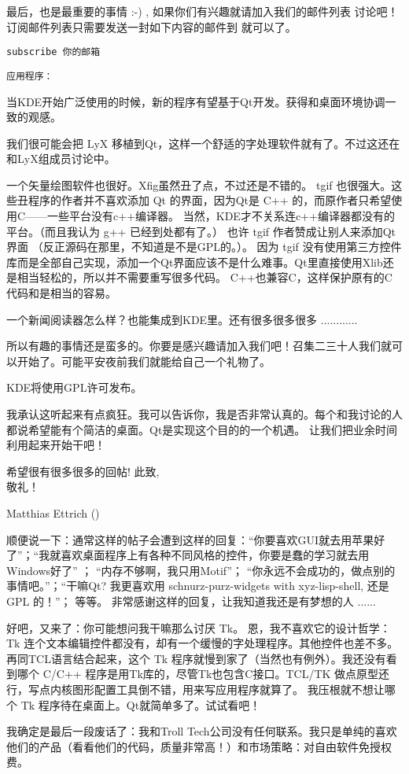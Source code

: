\begin{insertnote}
{	最后，也是最重要的事情 :-) , 如果你们有兴趣就请加入我们的邮件列表   讨论吧！
	订阅邮件列表只需要发送一封如下内容的邮件到  就可以了。
	
\begin{center}
	{\tt subscribe 你的邮箱}
\end{center}


{ \noindent \tt 应用程序：}

	当KDE开始广泛使用的时候，新的程序有望基于Qt开发。获得和桌面环境协调一致的观感。

    我们很可能会把 LyX 移植到Qt，这样一个舒适的字处理软件就有了。不过这还在和LyX组成员讨论中。

    一个矢量绘图软件也很好。Xfig虽然丑了点，不过还是不错的。 tgif 也很强大。这些丑程序的作者并不喜欢添加 Qt 的界面，因为Qt是 C++ 的，而原作者只希望使用C——一些平台没有c++编译器。
    当然，KDE才不关系连c++编译器都没有的平台。（而且我认为 g++ 已经到处都有了。） 也许 tgif 作者赞成让别人来添加Qt界面 （反正源码在那里，不知道是不是GPL的。）。
    因为 tgif 没有使用第三方控件库而是全部自己实现，添加一个Qt界面应该不是什么难事。Qt里直接使用Xlib还是相当轻松的，所以并不需要重写很多代码。
    C++也兼容C，这样保护原有的C代码和是相当的容易。

    一个新闻阅读器怎么样？也能集成到KDE里。还有很多很多很多 ............

}

所以有趣的事情还是蛮多的。你要是感兴趣请加入我们吧！召集二三十人我们就可以开始了。可能平安夜前我们就能给自己一个礼物了。

KDE将使用GPL许可发布。

我承认这听起来有点疯狂。我可以告诉你，我是否非常认真的。每个和我讨论的人都说希望能有个简洁的桌面。Qt是实现这个目的的一个机遇。
让我们把业余时间利用起来开始干吧！

希望很有很多很多的回帖!
此致,\\
\qquad 敬礼！

Matthias Ettrich
()

顺便说一下：通常这样的帖子会遭到这样的回复：“你要喜欢GUI就去用苹果好了”；“我就喜欢桌面程序上有各种不同风格的控件，你要是蠢的学习就去用Windows好了” ； “内存不够啊，我只用Motif”；
“你永远不会成功的，做点别的事情吧。”；“干嘛Qt? 我更喜欢用 schnurz-purz-widgets with xyz-lisp-shell, 还是 GPL 的！”； 等等。
非常感谢这样的回复，让我知道我还是有梦想的人 ......

好吧，又来了：你可能想问我干嘛那么讨厌 Tk。 恩，我不喜欢它的设计哲学： Tk 连个文本编辑控件都没有，却有一个缓慢的字处理程序。其他控件也差不多。
再同TCL语言结合起来，这个 Tk 程序就慢到家了（当然也有例外）。我还没有看到哪个 C/C++ 程序是用Tk库的，尽管Tk也包含C接口。TCL/TK 做点原型还行，写点内核图形配置工具倒不错，用来写应用程序就算了。
我压根就不想让哪个 Tk 程序待在桌面上。Qt就简单多了。试试看吧！

我确定是最后一段废话了：我和Troll Tech公司没有任何联系。我只是单纯的喜欢他们的产品（看看他们的代码，质量非常高！）和市场策略：对自由软件免授权费。

\end{insertnote}


